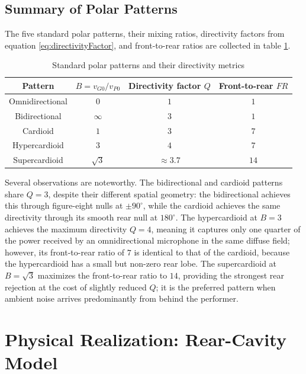 \subsection{Summary of Polar Patterns}

The five standard polar patterns, their mixing ratios, directivity factors from equation \eqref{eq:directivityFactor}, and front-to-rear ratios are collected in table \ref{tab:polarPatterns}.

\begin{table}[!htb]
\centering
\renewcommand{\arraystretch}{1.3}
\begin{tabular}{cccc}
\hline
\textbf{Pattern} & \textbf{\(B = v_{G0}/v_{P0}\)} & \textbf{Directivity factor \(Q\)} & \textbf{Front-to-rear \(FR\)} \\
\hline
Omnidirectional & \(0\)         & \(1\)        & \(1\)  \\
Bidirectional   & \(\infty\)    & \(3\)        & \(1\)  \\
Cardioid        & \(1\)         & \(3\)        & \(7\)  \\
Hypercardioid   & \(3\)         & \(4\)        & \(7\)  \\
Supercardioid   & \(\sqrt{3}\)  & \(\approx 3.7\) & \(14\) \\
\hline
\end{tabular}
\caption{Standard polar patterns and their directivity metrics}
\label{tab:polarPatterns}
\end{table}

Several observations are noteworthy.
The bidirectional and cardioid patterns share \(Q = 3\), despite their different spatial geometry: the bidirectional achieves this through figure-eight nulls at \(\pm 90^\circ\), while the cardioid achieves the same directivity through its smooth rear null at \(180^\circ\).
The hypercardioid at \(B = 3\) achieves the maximum directivity \(Q = 4\), meaning it captures only one quarter of the power received by an omnidirectional microphone in the same diffuse field; however, its front-to-rear ratio of \(7\) is identical to that of the cardioid, because the hypercardioid has a small but non-zero rear lobe.
The supercardioid at \(B = \sqrt{3}\) maximizes the front-to-rear ratio to \(14\), providing the strongest rear rejection at the cost of slightly reduced \(Q\); it is the preferred pattern when ambient noise arrives predominantly from behind the performer.

\section{Physical Realization: Rear-Cavity Model}

